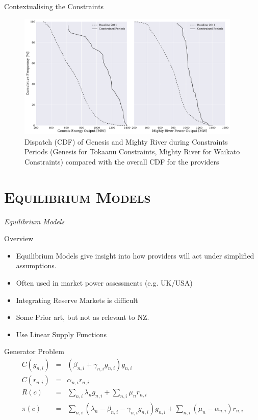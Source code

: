 \documentclass[xcolor=x11names,compress]{beamer}
\renewcommand{\(}{\begin{columns}}
\renewcommand{\)}{\end{columns}}
\newcommand{\<}[1]{\begin{column}{#1}}
\renewcommand{\>}{\end{column}}
\begin{document}
\begin{frame}{Contextualising the Constraints}
\begin{figure}
\includegraphics[width=0.95\textwidth]{img/gen_mrp_output_vs_baseline.pdf}
\caption{Dispatch (CDF) of Genesis and Mighty River during Constraints Periods
(Genesis for Tokaanu Constraints, Mighty River for Waikato Constraints)
compared with the overall CDF for the providers}
\end{figure}
\end{frame}

\section{\scshape Equilibrium Models}
\begin{frame}
\vspace{1.5cm}
\begin{center}
{\Huge\textit{Equilibrium Models}}
\end{center}
\end{frame}

\begin{frame}{Overview}
\begin{itemize}
\item Equilibrium Models give insight into how providers will act under
simplified assumptions.
\item Often used in market power assessments (e.g. UK/USA)
\item Integrating Reserve Markets is difficult
\item Some Prior art, but not as relevant to NZ.
\item Use Linear Supply Functions
\end{itemize}
\end{frame}

\begin{frame}{Generator Problem}
\begin{eqnarray*}
C(g_{n,i}) &=& (\beta_{n,i} + \gamma_{n,i}g_{n,i})g_{n,i} \\
C(r_{n,i}) &=& \alpha_{n,i}r_{n,i} \\
R(c) &=& \sum_{n,i} \lambda_{n}g_{n,i} + \sum_{n,i} \mu_{n}r_{n,i} \\
\pi(c) &=& \sum_{n,i} (\lambda_{n} - \beta_{n,i} - \gamma_{n,i}g_{n,i})g_{n,i} + \sum_{n,i} (\mu_{n} - \alpha_{n,i})r_{n,i}
\end{eqnarray*}
\end{frame}
\end{document}
